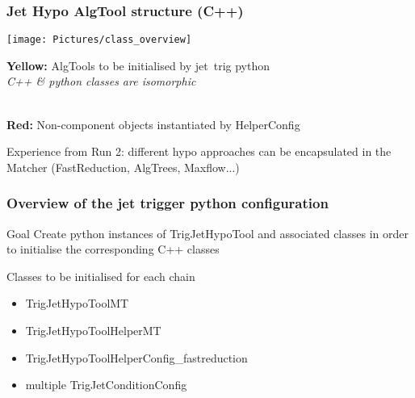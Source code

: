\documentclass{beamer}
\begin{document}
\frame 
 {
 \frametitle{Jet Hypo AlgTool structure (C++)}
   \begin{block}{}
      \begin{minipage}[T]{0.75\linewidth}
   \texttt{[image: Pictures/class\_overview]}
   \end{minipage}%
         \begin{minipage}[T]{0.25\linewidth}
         \begin{small}
          {\bf Yellow:} AlgTools to be initialised by jet~trig python\\
          {\it C++ \& python classes are isomorphic}
          
          \hrulefill\\
          {\bf Red:} Non-component objects instantiated by HelperConfig
          \end{small}
           \end{minipage}
   \end{block}   
   \begin{block}{}
   Experience from Run 2:  different hypo approaches can be encapsulated in the Matcher (FastReduction, AlgTrees, Maxflow...)
   \end{block}
}

\frame 
 {
 \frametitle{Overview of the jet trigger python configuration}
 \begin{block}{Goal}
 Create python instances of TrigJetHypoTool and associated classes in order to initialise the  corresponding C++ classes
  \end{block}
  \begin{block}{Classes to be initialised for each chain}
  \begin{itemize}
  \item TrigJetHypoToolMT
  \item TrigJetHypoToolHelperMT
  \item TrigJetHypoToolHelperConfig\_fastreduction
  \item multiple TrigJetConditionConfig
  \end{itemize}


  \end{block}
  
}

\end{document}
